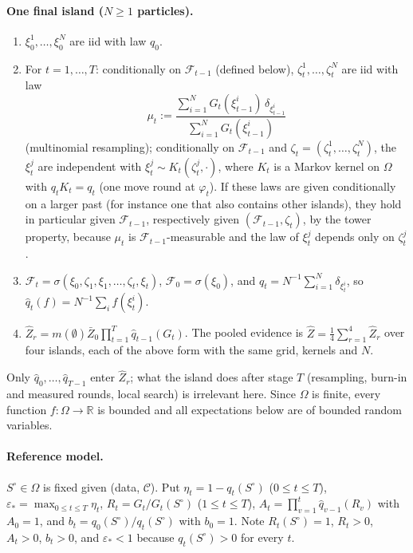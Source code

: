 \documentclass[11pt]{article}
\theoremstyle{remark}
\newcommand{\F}{\mathcal{F}}
\newcommand{\Om}{\Omega}
\newcommand{\qh}{\widehat q}
\newcommand{\Zh}{\widehat Z}
\newcommand{\Zb}{\bar Z}
\newcommand{\So}{S^{\circ}}
\begin{document}
\paragraph{One final island ($N\ge1$ particles).}
\begin{enumerate}[label=(\alph*)]
\item $\xi_0^1,\dots,\xi_0^N$ are iid with law $q_0$.
\item For $t=1,\dots,T$: conditionally on $\F_{t-1}$ (defined below), $\zeta_t^1,\dots,\zeta_t^N$ are iid with law
  \[
  \mu_t:=\frac{\sum_{i=1}^N G_t(\xi_{t-1}^i)\,\delta_{\xi_{t-1}^i}}{\sum_{i=1}^N G_t(\xi_{t-1}^i)}
  \]
  (multinomial resampling); conditionally on $\F_{t-1}$ and $\zeta_t=(\zeta_t^1,\dots,\zeta_t^N)$, the $\xi_t^j$ are independent
  with $\xi_t^j\sim K_t(\zeta_t^j,\cdot)$, where $K_t$ is a Markov kernel on $\Om$ with $q_tK_t=q_t$ (one move round at
  $\varphi_t$). If these laws are given conditionally on a larger past (for instance one that also contains other
  islands), they hold in particular given $\F_{t-1}$, respectively given $(\F_{t-1},\zeta_t)$, by the tower property,
  because $\mu_t$ is $\F_{t-1}$-measurable and the law of $\xi_t^j$ depends only on $\zeta_t^j$.
\item $\F_{t}=\sigma(\xi_0,\zeta_1,\xi_1,\dots,\zeta_t,\xi_t)$, $\F_0=\sigma(\xi_0)$, and
  $\qh_t=N^{-1}\sum_{i=1}^N\delta_{\xi_t^i}$, so $\qh_t(f)=N^{-1}\sum_i f(\xi_t^i)$.
\item $\Zh_r=m(\emptyset)\Zb_0\prod_{t=1}^T\qh_{t-1}(G_t)$. The pooled evidence is $\Zh=\tfrac14\sum_{r=1}^4\Zh_r$ over four
  islands, each of the above form with the same grid, kernels and $N$.
\end{enumerate}
Only $\qh_0,\dots,\qh_{T-1}$ enter $\Zh_r$; what the island does after stage $T$ (resampling, burn-in and measured rounds,
local search) is irrelevant here. Since $\Om$ is finite, every function $f:\Om\to\mathbb R$ is bounded and all
expectations below are of bounded random variables.

\paragraph{Reference model.} $\So\in\Om$ is fixed given (data, $\mathcal C$). Put
$\eta_t=1-q_t(\So)$ ($0\le t\le T$), $\varepsilon_*=\max_{0\le t\le T}\eta_t$,
$R_t=G_t/G_t(\So)$ ($1\le t\le T$), $A_t=\prod_{v=1}^t\qh_{v-1}(R_v)$ with $A_0=1$, and $b_t=q_0(\So)/q_t(\So)$ with
$b_0=1$. Note $R_t(\So)=1$, $R_t>0$, $A_t>0$, $b_t>0$, and $\varepsilon_*<1$ because $q_t(\So)>0$ for every $t$.
\end{document}
